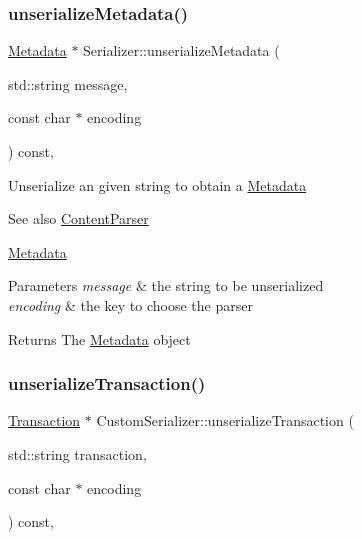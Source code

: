 \subsubsection{\texorpdfstring{unserialize\+Metadata()}{unserializeMetadata()}}
{\footnotesize\ttfamily \mbox{\hyperlink{classMetadata}{Metadata}} $\ast$ Serializer\+::unserialize\+Metadata (\begin{DoxyParamCaption}\item[{std\+::string}]{message,  }\item[{const char $\ast$}]{encoding }\end{DoxyParamCaption}) const\hspace{0.3cm}{\ttfamily [virtual]}, {\ttfamily [inherited]}}

Unserialize an given string to obtain a \mbox{\hyperlink{classMetadata}{Metadata}} \begin{DoxySeeAlso}{See also}
\mbox{\hyperlink{classContentParser}{Content\+Parser}} 

\mbox{\hyperlink{classMetadata}{Metadata}}
\end{DoxySeeAlso}

\begin{DoxyParams}{Parameters}
{\em message} & the string to be unserialized \\
\hline
{\em encoding} & the key to choose the parser \\
\hline
\end{DoxyParams}
\begin{DoxyReturn}{Returns}
The \mbox{\hyperlink{classMetadata}{Metadata}} object 
\end{DoxyReturn}
\mbox{\label{classCustomSerializer_abff58f1a955c2f399127b7e3cae23223}} 
\subsubsection{\texorpdfstring{unserialize\+Transaction()}{unserializeTransaction()}}
{\footnotesize\ttfamily \mbox{\hyperlink{classTransaction}{Transaction}} $\ast$ Custom\+Serializer\+::unserialize\+Transaction (\begin{DoxyParamCaption}\item[{std\+::string}]{transaction,  }\item[{const char $\ast$}]{encoding }\end{DoxyParamCaption}) const\hspace{0.3cm}{\ttfamily [override]}, {\ttfamily [virtual]}}

